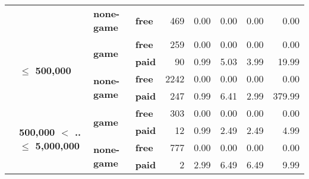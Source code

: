 \begin{tabular}{llll|rrrrr}
\cline{3-9}
      &                                 & \textbf{none-game} & \textbf{free} &    469 &       0.00 &       0.00 &       0.00 &         0.00 \\
\cline{2-9}
      & \multirow{4}{*}{\textbf{$\leq$ 500,000}} & \multirow{2}{*}{\textbf{game}} & \textbf{free} &    259 &       0.00 &       0.00 &       0.00 &         0.00 \\
      &                                 &           & \textbf{paid} &     90 &       0.99 &       5.03 &       3.99 &        19.99 \\
\cline{3-9}
      &                                 & \multirow{2}{*}{\textbf{none-game}} & \textbf{free} &   2242 &       0.00 &       0.00 &       0.00 &         0.00 \\
      &                                 &           & \textbf{paid} &    247 &       0.99 &       6.41 &       2.99 &       379.99 \\
\cline{2-9}
\cline{3-9}
      & \multirow{4}{*}{\textbf{500,000 $<$ .. $\leq$ 5,000,000}} & \multirow{2}{*}{\textbf{game}} & \textbf{free} &    303 &       0.00 &       0.00 &       0.00 &         0.00 \\
      &                                 &           & \textbf{paid} &     12 &       0.99 &       2.49 &       2.49 &         4.99 \\
\cline{3-9}
      &                                 & \multirow{2}{*}{\textbf{none-game}} & \textbf{free} &    777 &       0.00 &       0.00 &       0.00 &         0.00 \\
      &                                 &           & \textbf{paid} &      2 &       2.99 &       6.49 &       6.49 &         9.99 \\
\bottomrule
\end{tabular}
